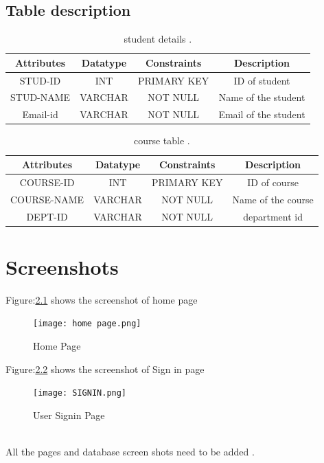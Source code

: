 \documentclass[12pt, letter paper]{report}
\begin{document}
\section{Table description} 
\begin{center}
\begin{table}[h!]
\centering
    \begin{tabular}{|c|c|c|c|}
    \hline
      Attributes &Datatype &Constraints&Description  \\
      \hline
      \hline
         STUD-ID&INT&PRIMARY KEY&ID of student  \\
         \hline
         STUD-NAME&VARCHAR&NOT NULL& Name of the student\\ 
         \hline
         Email-id&VARCHAR&NOT NULL& Email of the student\\ 
         \hline
    \end{tabular}
    \caption{student details .}
\label{table:1}
    \end{table}
\end{center}

\begin{center}
\begin{table}[h!]
\centering
    \begin{tabular}{|c|c|c|c|}
    \hline
      Attributes &Datatype &Constraints&Description  \\
      \hline
      \hline
         COURSE-ID&INT&PRIMARY KEY&ID of course  \\
         \hline
         COURSE-NAME&VARCHAR&NOT NULL& Name of the course\\ 
         \hline
         DEPT-ID&VARCHAR&NOT NULL& department id\\ 
         \hline
    \end{tabular}
    \caption{course table .}
\label{table:1}
    \end{table}
\end{center}
\chapter{Screenshots}

Figure:\ref{fig:home page.png} shows the screenshot of home page 
\begin{figure}[h]
 \centering
 \texttt{[image: home page.png]}
 \caption{Home Page}
 \label{fig:home page.png}
\end{figure}

Figure:\ref{fig:SIGNIN.png} shows the screenshot of Sign in  page 
\begin{figure}[h]
 \centering
 \texttt{[image: SIGNIN.png]}
 \caption{User Signin Page}
 \label{fig:SIGNIN.png}
\end{figure}
\\All the pages and database screen shots need to be added .
\end{document}
